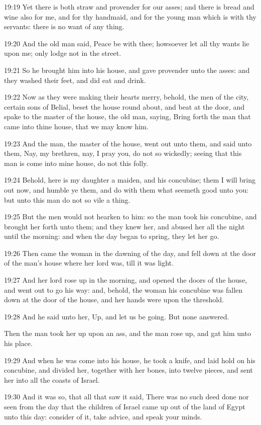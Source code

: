19:19 Yet there is both straw and provender for our asses; and there is bread and wine also for me, and for thy handmaid, and for the young man which is with thy servants: there is no want of any thing.

19:20 And the old man said, Peace be with thee; howsoever let all thy wants lie upon me; only lodge not in the street.

19:21 So he brought him into his house, and gave provender unto the asses: and they washed their feet, and did eat and drink.

19:22 Now as they were making their hearts merry, behold, the men of the city, certain sons of Belial, beset the house round about, and beat at the door, and spake to the master of the house, the old man, saying, Bring forth the man that came into thine house, that we may know him.

19:23 And the man, the master of the house, went out unto them, and said unto them, Nay, my brethren, nay, I pray you, do not so wickedly; seeing that this man is come into mine house, do not this folly.

19:24 Behold, here is my daughter a maiden, and his concubine; them I will bring out now, and humble ye them, and do with them what seemeth good unto you: but unto this man do not so vile a thing.

19:25 But the men would not hearken to him: so the man took his concubine, and brought her forth unto them; and they knew her, and abused her all the night until the morning: and when the day began to spring, they let her go.

19:26 Then came the woman in the dawning of the day, and fell down at the door of the man's house where her lord was, till it was light.

19:27 And her lord rose up in the morning, and opened the doors of the house, and went out to go his way: and, behold, the woman his concubine was fallen down at the door of the house, and her hands were upon the threshold.

19:28 And he said unto her, Up, and let us be going. But none answered.

Then the man took her up upon an ass, and the man rose up, and gat him unto his place.

19:29 And when he was come into his house, he took a knife, and laid hold on his concubine, and divided her, together with her bones, into twelve pieces, and sent her into all the coasts of Israel.

19:30 And it was so, that all that saw it said, There was no such deed done nor seen from the day that the children of Israel came up out of the land of Egypt unto this day: consider of it, take advice, and speak your minds.

